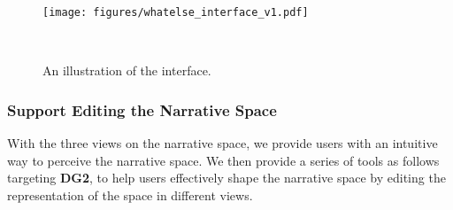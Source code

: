 

\begin{figure*}[t]
\centering
\texttt{[image: figures/whatelse\_interface\_v1.pdf]}
\vspace{-10pt}
\caption{An illustration of the interface.}
~\label{overview}
\vspace{-10pt}
\end{figure*}

\subsubsection{Support Editing the Narrative Space} 



With the three views on the narrative space, we provide users with an intuitive way to perceive the narrative space. We then provide a series of tools as follows targeting \textbf{DG2}, to help users effectively shape the narrative space by editing the representation of the space in different views. 






